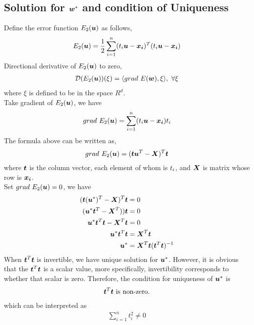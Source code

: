 \documentclass[11pt,a4paper]{article}
\newcommand{\htab}{\hspace*{0.63cm}}
\newcommand{\D}{\mathcal{D}}
\newcommand{\half}{\frac{1}{2}}
\begin{document}
\subsection{Solution for $\boldsymbol{w}^{*}$ and condition of Uniqueness}
\htab Define the error function $E_{2}(\boldsymbol{u})$ as follows,
    \begin{align}
        E_{2}(\uu) =  \half \sum_{i=1}^{n} (\tti \uu - \xxi)^{T} (\tti \uu - \xxi)
    \end{align}
\htab Directional derivative of $E_{2}(\boldsymbol{u})$ to zero,
\begin{align}
    \D (E_{2}(\uu)) (\xi) = \langle grad\ E(\ww), \xi \rangle,\ \forall \xi
    \end{align}
\htab where $\xi$ is defined to be in the space $R^{d}$. \\
\htab Take gradient of $E_{2}(\boldsymbol{u})$, we have
\begin{align}
    grad\ E_{2}(\boldsymbol{u}) = \sum_{i=1}^{n} (t_{i} \boldsymbol{u} - \boldsymbol{x_{i}}) t_{i}
    \end{align}
\htab The formula above can be written as,
    \begin{align}
        grad\ E_{2}(\boldsymbol{u}) = (\boldsymbol{t} \boldsymbol{u}^{T} - \boldsymbol{X}) ^{T} \boldsymbol{t}
    \end{align}
\htab where $\boldsymbol{t}$ is the column vector, each element of whom is $t_{i}$, and $\boldsymbol{X}$ is matrix whose row is $\boldsymbol{x_{i}}$.\\ 
\htab Set $grad\ E_{2}(\boldsymbol{u}) = 0$, we have
    \begin{align}
        (\boldsymbol{t} (\boldsymbol{u}^{*})^{T} - \boldsymbol{X}) ^{T} \boldsymbol{t} &= 0 \\
        (\boldsymbol{u}^{*} \boldsymbol{t}^{T} - \boldsymbol{X}^{T})) \boldsymbol{t} &= 0 \\
        \boldsymbol{u}^{*} \boldsymbol{t}^{T} \boldsymbol{t} - \boldsymbol{X}^{T} \boldsymbol{t} & = 0 \\
        \boldsymbol{u}^{*} \boldsymbol{t}^{T} \boldsymbol{t} &= \boldsymbol{X}^{T} \boldsymbol{t} \\
        \boldsymbol{u}^{*} &= \boldsymbol{X}^{T} \boldsymbol{t} (\boldsymbol{t}^{T} \boldsymbol{t})^{-1} \label{2:uus}
    \end{align}
\htab When $\boldsymbol{t}^{T} \boldsymbol{t}$ is invertible, we have unique solution for $\boldsymbol{u}^{*}$. However, it is obvious that the $\boldsymbol{t}^{T} \boldsymbol{t}$ is a scalar value, more specifically, invertibility corresponds to whether that scalar is zero. Therefore, the condition for uniqueness of $\boldsymbol{u}^{*}$ is 
\begin{align}
    \text{$\boldsymbol{t}^{T} \boldsymbol{t}$ is non-zero.}
    \end{align}
\htab which can be interpreted as 
\begin{align}
    \sum_{i=1}^{n} t_{i}^{2} \neq 0
    \end{align}
\end{document}
